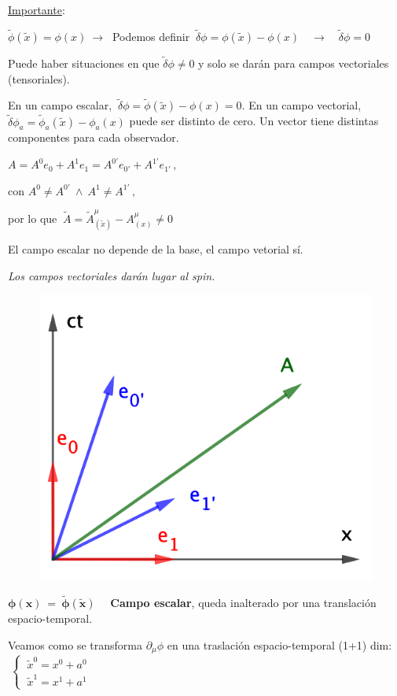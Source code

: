 \vspace{5mm}
\begin{ejemplo}
\underline{Importante}:

$\tilde \phi(\tilde x)=\phi(x) \ \to \ $ Podemos definir $\ \tilde \delta \phi=	\phi(\tilde x)-\phi(x) \quad \to \quad \tilde \delta \phi=0$

Puede haber situaciones en que $\tilde \delta \phi \neq 0$ y solo se darán para campos vectoriales (tensoriales).

En un campo escalar, $\ \tilde \delta \phi=\tilde \phi(\tilde x)-\phi(x)=0$. En un campo vectorial, $ \tilde \delta \phi_a=\tilde \phi_a(\tilde x)-\phi_a(x)$ puede ser distinto de cero. Un vector  tiene distintas componentes para cada observador.
\begin{multicols}{2}


$A=A^0e_0+A^1e_1=A^{0'}e_{0'}+A^{1'}e_{1'}\, , \ $ 

con $A^0\neq A^{0'} \ \wedge \ A^1\neq A^{1'}\, , \ $

por lo que $\ \tilde A=\tilde A^\mu_{(\tilde x)} - A^\mu_{(x)} \neq 0$

El campo escalar no depende de la base, el campo vetorial sí.

\emph{Los campos vectoriales darán lugar al spin.}

\begin{figure}[H]
	\centering
	\includegraphics[width=.4\textwidth]{imagenes/img34-01.png}
\end{figure}
\end{multicols}
\end{ejemplo}

$\boldsymbol{ \phi(x) \ = \ \tilde \phi(\tilde x) } \quad $ \textbf{Campo escalar}, queda inalterado por una translación espacio-temporal.

Veamos como se transforma $\partial_\mu \phi$ en una
traslación espacio-temporal (1+1) dim: $\ \begin{cases} \ \tilde x^0=x^0+a^0 \\ \ \tilde x^1=x^1+a^1 \end{cases}$

